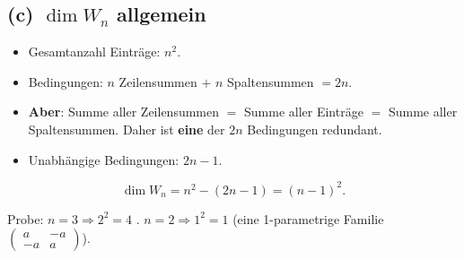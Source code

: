 \documentclass[a4paper,12pt]{article}
\begin{document}
\subsection*{(c) $\dim W_n$ allgemein}

\begin{merkbox}[title={Der Z\"ahltrick}]
\begin{itemize}[nosep]
    \item Gesamtanzahl Eintr\"age: $n^2$.
    \item Bedingungen: $n$ Zeilensummen $+$ $n$ Spaltensummen $= 2n$.
    \item \textbf{Aber}: Summe aller Zeilensummen $=$ Summe aller Eintr\"age $=$ Summe aller Spaltensummen. Daher ist \textbf{eine} der $2n$ Bedingungen redundant.
    \item Unabh\"angige Bedingungen: $2n - 1$.
\end{itemize}
\[
\dim W_n = n^2 - (2n - 1) = (n-1)^2.
\]
\end{merkbox}

Probe: $n = 3 \Rightarrow 2^2 = 4$ \checkmark. \quad $n = 2 \Rightarrow 1^2 = 1$ (eine 1-parametrige Familie $\begin{pmatrix} a & -a \\ -a & a \end{pmatrix}$).
\end{document}

